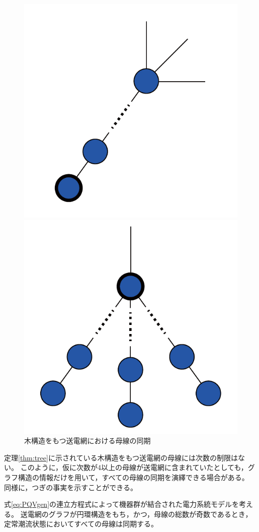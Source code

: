 \documentclass[tombow,dvipdfmx]{corona-a5-1.1}
\begin{document}
\begin{figure}[t]
  \centering
  {
  \begin{minipage}{0.40\linewidth}
    \centering
    \includegraphics[width = .50\linewidth]{figs/treesub}
    \subcaption{ }
  \end{minipage}
  \begin{minipage}{0.40\linewidth}
    \centering
    \includegraphics[width = .50\linewidth]{figs/tree}
    \subcaption{ }
  \end{minipage}
  \medskip
  \caption{木構造をもつ送電網における母線の同期}
  \label{fig:treepr}
  }
\medskip
\end{figure}
定理\ref{thm:tree}に示されている木構造をもつ送電網の母線には次数の制限はない。
このように，仮に次数が4以上の母線が送電網に含まれていたとしても，グラフ構造の情報だけを用いて，すべての母線の同期を演繹できる場合がある。
同様に，つぎの事実を示すことができる。

\begin{定理}[円環構造の送電網における母線の同期]
\label{thm:circ}
式\ref{eq:PQVgen}の連立方程式によって機器群が結合された電力系統モデルを考える。
送電網のグラフが円環構造をもち，かつ，母線の総数が奇数であるとき，定常潮流状態においてすべての母線は同期する。
\end{定理}
\end{document}
